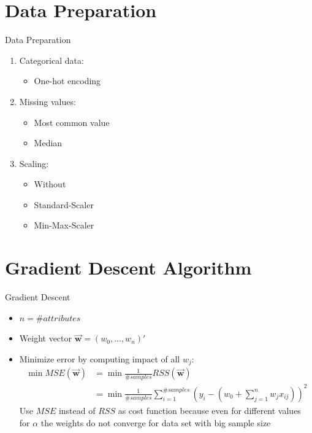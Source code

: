 \documentclass[10pt]{beamer}
\newcommand{\w}{\vec{\textbf{w}}}
\begin{document}
\section[Data Preparation]{Data Preparation}
    \begin{frame}[fragile]{Data Preparation}
        \begin{enumerate}
            \item Categorical data:
                \begin{itemize}
                    \item One-hot encoding
                \end{itemize}
                
            \item Missing values:
                \begin{itemize}
                    \item Most common value
                    \item Median
                \end{itemize}
                    
            \item Scaling:
                \begin{itemize}
                    \item Without
                    \item Standard-Scaler 
                    \item Min-Max-Scaler
                \end{itemize}
        \end{enumerate}
    \end{frame}
    
\section[Gradient Descent]{Gradient Descent Algorithm}
    \begin{frame}[fragile]{Gradient Descent}
        \begin{itemize}
            \item $n=\#attributes$
            \item Weight vector $\w = (w_0, ..., w_n)'$
            \item Minimize error by computing impact of all $w_j$:
                \begin{align*}
                    \min MSE(\w) &= \min \frac{1}{\#samples} RSS(\w) \\
                    &= \min \frac{1}{\#samples} \sum_{i=1}^{\#samples}(y_i - (w_0 + \sum_{j=1}^{n}w_{j} x_{ij}))^2
                \end{align*}
                Use $MSE$ instead of $RSS$ as cost function because even for different values for $\alpha$ the weights do not converge for data set with big sample size
        \end{itemize}
    \end{frame}
    
\end{document}
